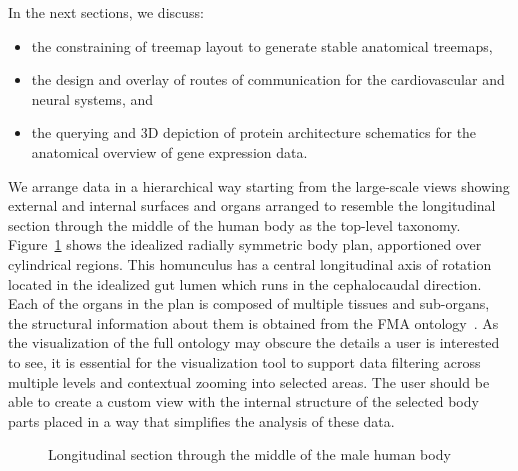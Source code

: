 In the next sections, we discuss:
\begin{itemize}
  \item the constraining of treemap layout to generate stable anatomical treemaps,
  \item the design and overlay of routes of communication for the cardiovascular and neural systems, and
  \item the querying and 3D depiction of protein architecture schematics for the anatomical overview of gene expression data.
\end{itemize}

We arrange data in a hierarchical way starting from the large-scale views showing external and internal surfaces and organs
arranged to resemble the longitudinal section through the middle of the human body as the top-level taxonomy.
Figure~\ref{fig:application} shows the idealized radially symmetric body plan, apportioned over cylindrical regions.
This homunculus has a central longitudinal axis of rotation located in the idealized gut lumen which runs in the cephalocaudal direction.
Each of the organs in the plan is composed of multiple tissues and sub-organs, the structural information about them is obtained from the FMA ontology~\cite{RM03}. As the visualization of the full ontology may obscure the details a user is interested to see, it is essential for the visualization tool to support data filtering across multiple levels and contextual zooming into selected areas. The user should be able to create a custom view with the internal structure of the selected body parts placed in a way that simplifies the analysis of these data.

\begin{figure}
\centering
  \caption{Longitudinal section through the middle of the male human body}
  \label{fig:application}
\end{figure}
